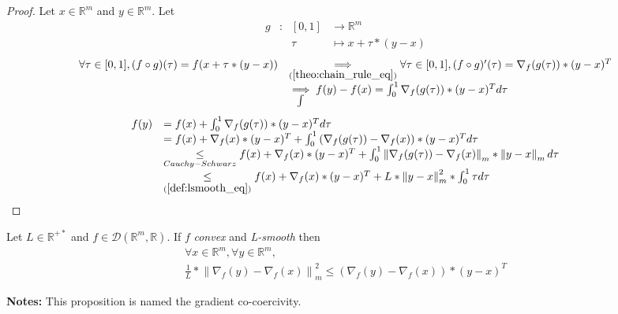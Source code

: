 \documentclass[11pt,en]{elegantpaper}
\newcommand{\norm}[1]{\left\lVert#1\right\rVert}
\newcommand{\Real}{\mathbb{R}}
\begin{document}
\begin{proof}
  Let $x \in \Real^m$ and $y \in \Real^m$. Let \begin{equation*}
    \begin{array}{llll}
      g & : & [0,1] & \longrightarrow \Real^m \\
      & & \tau & \longmapsto x + \tau * (y - x)
    \end{array}
  \end{equation*}
  \begin{equation*}
    \begin{array}{ll}
      \forall \tau \in [0,1], (f \circ g)(\tau) = f(x + \tau * (y - x)) & \underset{(\ref{theo:chain_rule_eq})}{\implies}
        \forall \tau \in [0,1], (f \circ g)'(\tau) = \nabla_f(g(\tau)) * (y - x)^T \\
      & \underset{\int_{}^{}}{\implies} f(y) - f(x) = \int_{0}^{1}{\nabla_f(g(\tau)) * (y - x)^T d\tau}
    \end{array}
  \end{equation*}
  \begin{equation*}
    \begin{array}{ll}
      f(y) & = f(x) + \int_{0}^{1}{\nabla_f(g(\tau)) * (y - x)^T d\tau} \\
      & = f(x) + \nabla_f(x) * (y - x)^T + \int_{0}^{1}{(\nabla_f(g(\tau)) - \nabla_f(x)) * (y - x)^T d\tau} \\
      & \underset{Cauchy-Schwarz}{\leq} f(x) + \nabla_f(x) * (y - x)^T + \int_{0}^{1}{\norm{\nabla_f(g(\tau)) - \nabla_f(x)}_m * \norm{y - x}_m d\tau} \\
      & \underset{(\ref{def:lsmooth_eq})}{\leq} f(x) + \nabla_f(x) * (y - x)^T + L * \norm{y - x}_m^2 * \int_{0}^{1}{\tau d\tau}
    \end{array}
  \end{equation*}
\end{proof}

\begin{proposition}
  {\normalfont
    Let $L \in \Real^{+*}$ and $f \in \mathcal{D}(\Real^m,\Real)$. If $f$ \textit{convex} and \textit{L-smooth} then \begin{equation}\label{prop:grad_cocoercivity}
      \begin{gathered}
        \forall x \in \Real^m, \forall y \in \Real^m, \\
        \frac{1}{L} * \norm{\nabla_f(y) - \nabla_f(x)}_m^2 \leq (\nabla_f(y) - \nabla_f(x)) * (y - x)^T
      \end{gathered}
    \end{equation} \par
    \textbf{Notes:} This proposition is named the gradient co-coercivity.
  }
\end{proposition}
\end{document}
